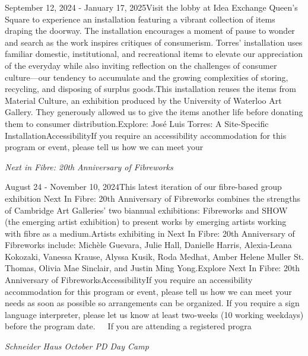 \documentclass[letterpaper, 10pt]{article}
\newcommand{\subtitle}[1]{\textit{\large #1}\vspace{0.5em}}
\newcommand{\articlecontent}[1]{\small #1\vspace{1em}}
\begin{document}
\begin{multicols}{2}
{September 12, 2024 - January 17, 2025Visit the lobby at Idea Exchange Queen's Square to experience an installation featuring a vibrant collection of items draping the doorway. The installation encourages a moment of pause to wonder and search as the work inspires critiques of consumerism. Torres’ installation uses familiar domestic, institutional, and recreational items to elevate our appreciation of the everyday while also inviting reflection on the challenges of consumer culture—our tendency to accumulate and the growing complexities of storing, recycling, and disposing of surplus goods.This installation reuses the items from Material Culture, an exhibition produced by the University of Waterloo Art Gallery. They generously allowed us to give the items another life before donating them to consumer distribution.Explore: José Luis Torres: A Site-Specific InstallationAccessibilityIf you require an accessibility accommodation for this program or event, please tell us how we can meet your
}
\vspace{10px}

\subtitle{Next in Fibre: 20th Anniversary of Fibreworks}

\articlecontent{

\qrcode[height=1.5cm]{https://ideaexchange.libnet.info/event/11807110}
\vspace{10px}

August 24 - November 10, 2024This latest iteration of our fibre-based group exhibition Next In Fibre: 20th Anniversary of Fibreworks combines the strengths of Cambridge Art Galleries’ two biannual exhibitions: Fibreworks and SHOW (the emerging artist exhibition) to present works by emerging artists working with fibre as a medium.Artists exhibiting in Next In Fibre: 20th Anniversary of Fibreworks include: Michèle Guevara, Julie Hall, Danielle Harris, Alexia-Leana Kokozaki, Vanessa Krause, Alyssa Kusik, Roda Medhat, Amber Helene Muller St. Thomas, Olivia Mae Sinclair, and Justin Ming Yong.Explore Next In Fibre: 20th Anniversary of FibreworksAccessibilityIf you require an accessibility accommodation for this program or event, please tell us how we can meet your needs as soon as possible so arrangements can be organized. If you require a sign language interpreter, please let us know at least two-weeks (10 working weekdays) before the program date.   If you are attending a registered progra
}
\vspace{10px}

\subtitle{Schneider Haus October PD Day Camp}


\end{multicols}
\end{document}
